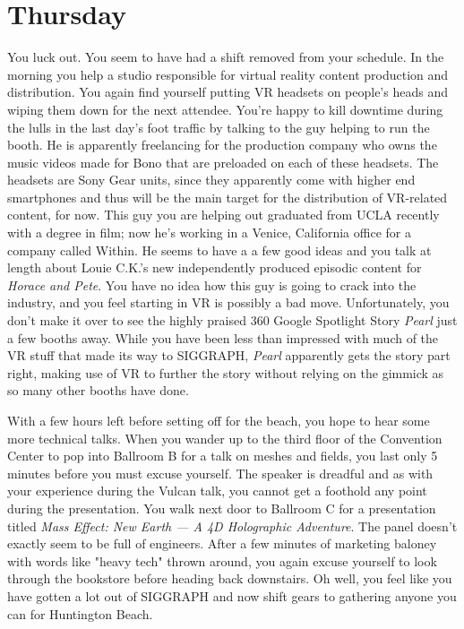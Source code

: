 \documentclass[../main.tex]{subfiles}
\begin{document}
\section{Thursday}

You luck out. You seem to have had a shift removed from your schedule. In the morning you help a studio responsible for virtual reality content production and distribution. You again find yourself putting VR headsets on people's heads and wiping them down for the next attendee. You're happy to kill downtime during the lulls in the last day's foot traffic by talking to the guy helping to run the booth. He is apparently freelancing for the production company who owns the music videos made for Bono that are preloaded on each of these headsets. The headsets are Sony Gear units, since they apparently come with higher end smartphones and thus will be the main target for the distribution of VR-related content, for now. This guy you are helping out graduated from UCLA recently with a degree in film; now he's working in a Venice, California office for a company called Within. He seems to have a a few good ideas and you talk at length about Louie C.K.'s new independently produced episodic content for \textit{Horace and Pete}. You have no idea how this guy is going to crack into the industry, and you feel starting in VR is possibly a bad move. Unfortunately, you don't make it over to see the highly praised 360 Google Spotlight Story \textit{Pearl} just a few booths away. While you have been less than impressed with much of the VR stuff that made its way to SIGGRAPH, \textit{Pearl} apparently gets the story part right, making use of VR to further the story without relying on the gimmick as so many other booths have done.

With a few hours left before setting off for the beach, you hope to hear some more technical talks. When you wander up to the third floor of the Convention Center to pop into Ballroom B for a talk on meshes and fields, you last only 5 minutes before you must excuse yourself. The speaker is dreadful and as with your experience during the Vulcan talk, you cannot get a foothold any point during the presentation. You walk next door to Ballroom C for a presentation titled \textit{Mass Effect: New Earth --- A 4D Holographic Adventure}. The panel doesn't exactly seem to be full of engineers. After a few minutes of marketing baloney with words like "heavy tech" thrown around, you again excuse yourself to look through the bookstore before heading back downstairs. Oh well, you feel like you have gotten a lot out of SIGGRAPH and now shift gears to gathering anyone you can for Huntington Beach.
\end{document}
